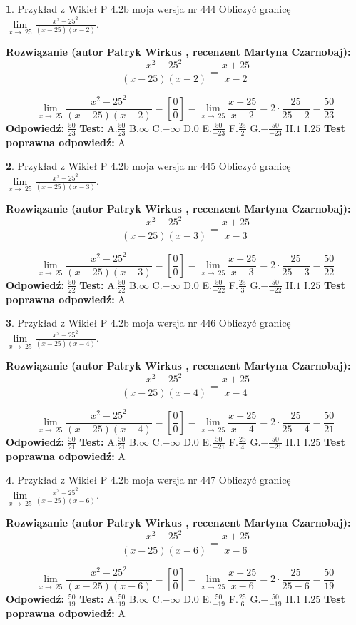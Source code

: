 \documentclass[12pt, a4paper]{article}
\theoremstyle{definition} %
\newtheorem{zad}{}
\newcommand{\zadStart}[1]{\begin{zad}#1\newline}
\newcommand{\zadStop}{\end{zad}}
\newcommand{\rozwStart}[2]{\noindent \textbf{Rozwiązanie (autor #1 , recenzent #2): }\newline}
\newcommand{\rozwStop}{\newline}
\newcommand{\odpStart}{\noindent \textbf{Odpowiedź:}\newline}
\newcommand{\odpStop}{\newline}
\newcommand{\testStart}{\noindent \textbf{Test:}\newline}
\newcommand{\testStop}{\newline}
\newcommand{\kluczStart}{\noindent \textbf{Test poprawna odpowiedź:}\newline}
\newcommand{\kluczStop}{\newline}
\begin{document}
\zadStart{Przykład z Wikieł P 4.2b moja wersja nr 444}
Obliczyć granicę $\lim\limits_{x\to\ 25}\frac{x^{2}-25^{2}}{(x-25)(x-2)}$.
\zadStop
\rozwStart{Patryk Wirkus}{Martyna Czarnobaj}
$$\frac{x^{2}-25^{2}}{(x-25)(x-2)}=\frac{x+25}{x-2}$$

$$\lim\limits_{x\to\ 25}\frac{x^{2}-25^{2}}{(x-25)(x-2)}=[\frac{0}{0}]=\lim\limits_{x\to\ 25}\frac{x+25}{x-2}=2 \cdot \frac{25}{25-2} = \frac{50}{23}$$
\rozwStop
\odpStart
$\frac{50}{23}$
\odpStop
\testStart
A.$\frac{50}{23}$
B.$\infty$
C.$-\infty$
D.$0$
E.$\frac{50}{-23}$
F.$\frac{25}{2}$
G.$-\frac{50}{-23}$
H.$1$
I.$25$
\testStop
\kluczStart
A
\kluczStop



\zadStart{Przykład z Wikieł P 4.2b moja wersja nr 445}
Obliczyć granicę $\lim\limits_{x\to\ 25}\frac{x^{2}-25^{2}}{(x-25)(x-3)}$.
\zadStop
\rozwStart{Patryk Wirkus}{Martyna Czarnobaj}
$$\frac{x^{2}-25^{2}}{(x-25)(x-3)}=\frac{x+25}{x-3}$$

$$\lim\limits_{x\to\ 25}\frac{x^{2}-25^{2}}{(x-25)(x-3)}=[\frac{0}{0}]=\lim\limits_{x\to\ 25}\frac{x+25}{x-3}=2 \cdot \frac{25}{25-3} = \frac{50}{22}$$
\rozwStop
\odpStart
$\frac{50}{22}$
\odpStop
\testStart
A.$\frac{50}{22}$
B.$\infty$
C.$-\infty$
D.$0$
E.$\frac{50}{-22}$
F.$\frac{25}{3}$
G.$-\frac{50}{-22}$
H.$1$
I.$25$
\testStop
\kluczStart
A
\kluczStop



\zadStart{Przykład z Wikieł P 4.2b moja wersja nr 446}
Obliczyć granicę $\lim\limits_{x\to\ 25}\frac{x^{2}-25^{2}}{(x-25)(x-4)}$.
\zadStop
\rozwStart{Patryk Wirkus}{Martyna Czarnobaj}
$$\frac{x^{2}-25^{2}}{(x-25)(x-4)}=\frac{x+25}{x-4}$$

$$\lim\limits_{x\to\ 25}\frac{x^{2}-25^{2}}{(x-25)(x-4)}=[\frac{0}{0}]=\lim\limits_{x\to\ 25}\frac{x+25}{x-4}=2 \cdot \frac{25}{25-4} = \frac{50}{21}$$
\rozwStop
\odpStart
$\frac{50}{21}$
\odpStop
\testStart
A.$\frac{50}{21}$
B.$\infty$
C.$-\infty$
D.$0$
E.$\frac{50}{-21}$
F.$\frac{25}{4}$
G.$-\frac{50}{-21}$
H.$1$
I.$25$
\testStop
\kluczStart
A
\kluczStop



\zadStart{Przykład z Wikieł P 4.2b moja wersja nr 447}
Obliczyć granicę $\lim\limits_{x\to\ 25}\frac{x^{2}-25^{2}}{(x-25)(x-6)}$.
\zadStop
\rozwStart{Patryk Wirkus}{Martyna Czarnobaj}
$$\frac{x^{2}-25^{2}}{(x-25)(x-6)}=\frac{x+25}{x-6}$$

$$\lim\limits_{x\to\ 25}\frac{x^{2}-25^{2}}{(x-25)(x-6)}=[\frac{0}{0}]=\lim\limits_{x\to\ 25}\frac{x+25}{x-6}=2 \cdot \frac{25}{25-6} = \frac{50}{19}$$
\rozwStop
\odpStart
$\frac{50}{19}$
\odpStop
\testStart
A.$\frac{50}{19}$
B.$\infty$
C.$-\infty$
D.$0$
E.$\frac{50}{-19}$
F.$\frac{25}{6}$
G.$-\frac{50}{-19}$
H.$1$
I.$25$
\testStop
\kluczStart
A
\kluczStop
\end{document}
